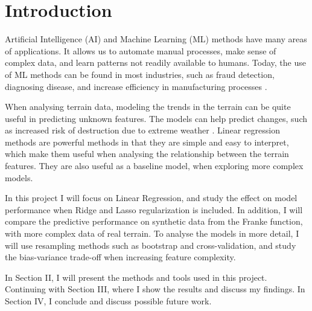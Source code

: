 \section{Introduction}\label{sec:introduction}

Artificial Intelligence (AI) and Machine Learning (ML) methods have many areas of applications. It allows us to automate manual processes, make sense of complex data, and learn patterns not readily available to humans. Today, the use of ML methods can be found in most industries, such as fraud detection, diagnosing disease, and increase efficiency in manufacturing processes \cite{forbes:2023:machine_learning}. 

When analysing terrain data, modeling the trends in the terrain can be quite useful in predicting unknown features. The models can help predict changes, such as increased risk of destruction due to extreme weather \cite{supriya:2015:regression_analysis}. Linear regression methods are powerful methods in that they are simple and easy to interpret, which make them useful when analysing the relationship between the terrain features. They are also useful as a baseline model, when exploring more complex models. 

In this project I will focus on Linear Regression, and study the effect on model performance when Ridge and Lasso regularization is included. In addition, I will compare the predictive performance on synthetic data from the Franke function, with more complex data of real terrain. To analyse the models in more detail, I will use resampling methods such as bootstrap and cross-validation, and study the bias-variance trade-off when increasing feature complexity.

In Section II, I will present the methods and tools used in this project. Continuing with Section III, where I show the results and discuss my findings. In Section IV, I conclude and discuss possible future work.



